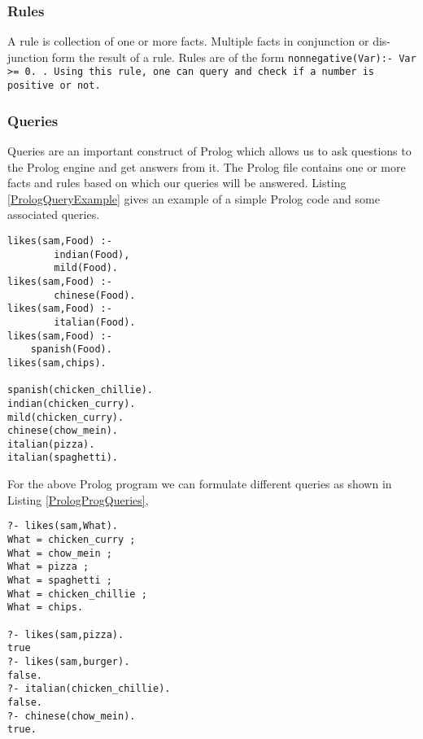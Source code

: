 \subsubsection{Rules}
A rule is collection of one or more facts. Multiple facts in conjunction or dis-junction form the result of a rule. Rules are of the form \tt{nonnegative(Var):- Var >= 0. }. Using this rule, one can query and check if a number is positive or not.

\subsubsection{Queries}
Queries are an important construct of Prolog which allows us to ask questions to the Prolog engine and get answers from it. The Prolog  file contains one or more facts and rules based on which our queries will be answered.
Listing \ref{PrologQueryExample} gives an example of a simple Prolog code and some associated queries. \linebreak

\begin{minipage}{\linewidth}    
\begin{lstlisting}[frame=single, caption={Prolog Queries}, label={PrologQueryExample}, captionpos=b, breaklines=true, showstringspaces=false]
likes(sam,Food) :-
        indian(Food),
        mild(Food).
likes(sam,Food) :-
        chinese(Food).
likes(sam,Food) :-
        italian(Food).
likes(sam,Food) :-
	spanish(Food).
likes(sam,chips).

spanish(chicken_chillie).
indian(chicken_curry).
mild(chicken_curry).
chinese(chow_mein).
italian(pizza).
italian(spaghetti).

\end{lstlisting}
\end{minipage} 

For the above Prolog program we can formulate different queries as shown in Listing \ref{PrologProgQueries},

\begin{minipage}{\linewidth}       
\begin{lstlisting}[frame=single, caption={Prolog example}, label={PrologProgQueries}, captionpos=b, breaklines=true]
?- likes(sam,What).
What = chicken_curry ;
What = chow_mein ;
What = pizza ;
What = spaghetti ;
What = chicken_chillie ;
What = chips.

?- likes(sam,pizza).
true
?- likes(sam,burger).
false.
?- italian(chicken_chillie).
false.
?- chinese(chow_mein).
true.

\end{lstlisting}
\end{minipage}

